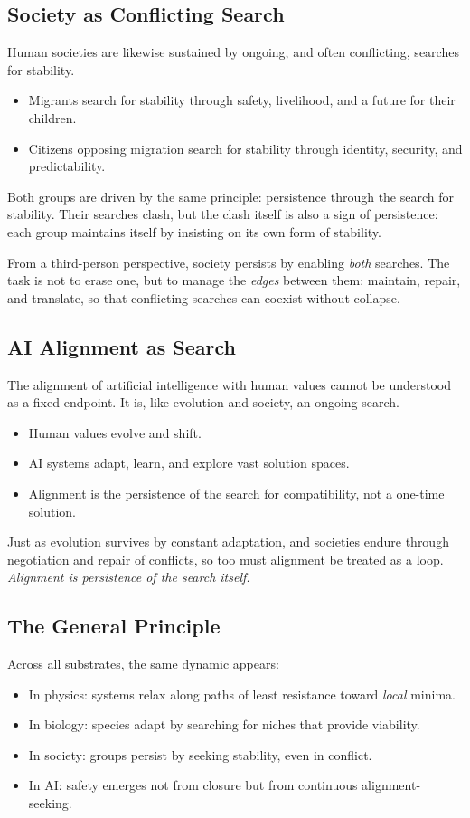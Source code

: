 \documentclass[11pt,a4paper]{article}
\begin{document}
\subsection*{Society as Conflicting Search}
Human societies are likewise sustained by ongoing, and often conflicting, searches for stability.  
\begin{itemize}
  \item Migrants search for stability through safety, livelihood, and a future for their children.  
  \item Citizens opposing migration search for stability through identity, security, and predictability.  
\end{itemize}

Both groups are driven by the same principle: persistence through the search for stability.  
Their searches clash, but the clash itself is also a sign of persistence: 
each group maintains itself by insisting on its own form of stability.  

From a third-person perspective, society persists by enabling \emph{both} searches.  
The task is not to erase one, but to manage the \emph{edges} between them: maintain, repair, and translate, so that conflicting searches can coexist without collapse.  

\subsection*{AI Alignment as Search}
The alignment of artificial intelligence with human values cannot be understood as a fixed endpoint.  
It is, like evolution and society, an ongoing search.  
\begin{itemize}
  \item Human values evolve and shift.  
  \item AI systems adapt, learn, and explore vast solution spaces.  
  \item Alignment is the persistence of the search for compatibility, not a one-time solution.  
\end{itemize}

Just as evolution survives by constant adaptation, 
and societies endure through negotiation and repair of conflicts, 
so too must alignment be treated as a loop.  
\emph{Alignment is persistence of the search itself.}

\subsection*{The General Principle}
Across all substrates, the same dynamic appears:
\begin{itemize}
  \item In physics: systems relax along paths of least resistance toward \emph{local} minima.  
  \item In biology: species adapt by searching for niches that provide viability.  
  \item In society: groups persist by seeking stability, even in conflict.  
  \item In AI: safety emerges not from closure but from continuous alignment-seeking.  
\end{itemize}
\end{document}
